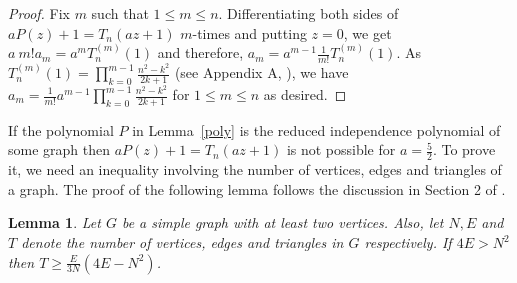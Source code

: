 \documentclass[12pt,a4paper]{article}
\theoremstyle{plain}
\newtheorem{lemma}{Lemma}
\numberwithin{equation}{section}
\begin{document}
\begin{proof}
Fix  $m$ such that $1\le m\le n$. Differentiating both sides of $a P(z)+1=T_n(az +1)$  $m$-times and putting $z=0$, we get $a ~m! a_m=a^m T_{n}^{(m)}(1)$  and   therefore, $a_m=a^{m-1} \frac{1}{m!}T_n^{(m)}(1).$ As $T_n^{(m)}(1)=\prod_{k=0}^{m-1}\frac{n^2-k^2}{2k+1}$ (see Appendix A, \cite{john}), %
	we have $a_m=\frac{1}{m!}a^{m-1}\prod_{k=0}^{m-1}\frac{n^2-k^2}{2k+1}$ for $1\le m \le n$ as desired.
 \end{proof}
If the polynomial $P$ in Lemma~\ref{poly} is the reduced independence polynomial of some graph then   $aP(z)+1=T_n(az+1)$ is not possible for $a=\frac{5}{2}$. To prove it, we need an inequality involving the number of vertices, edges and triangles of a graph. The proof of the following lemma follows the discussion in Section 2 of \cite{NS}.
  \begin{lemma}
  	Let $G$ be a simple graph with at least two vertices. Also, let $N, E$ and $T$ denote the number of vertices, edges and triangles in $G$ respectively. If $4E > N^2$ then $T \geq \frac{E}{3N} (4E -N^2)$.
  	\label{Nograph-k5-key}
  \end{lemma}
\end{document}
